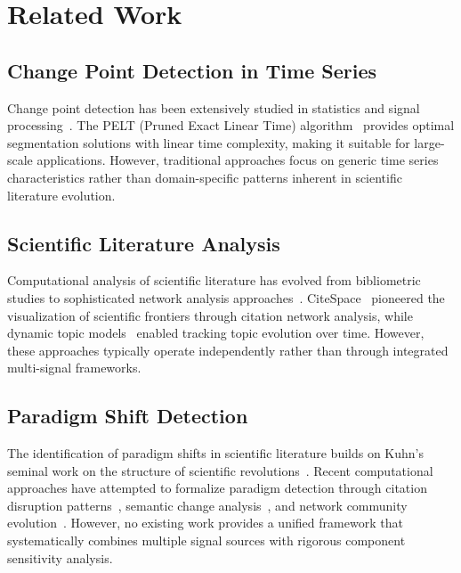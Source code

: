 \documentclass[conference]{IEEEtran}
\begin{document}
\section{Related Work}

\subsection{Change Point Detection in Time Series}

Change point detection has been extensively studied in statistics and signal processing~\cite{killick2014changepoint, chen2012parametric, truong2020selective}. The PELT (Pruned Exact Linear Time) algorithm~\cite{killick2014changepoint} provides optimal segmentation solutions with linear time complexity, making it suitable for large-scale applications. However, traditional approaches focus on generic time series characteristics rather than domain-specific patterns inherent in scientific literature evolution.

\subsection{Scientific Literature Analysis}

Computational analysis of scientific literature has evolved from bibliometric studies to sophisticated network analysis approaches~\cite{fortunato2018science, newman2004detecting}. CiteSpace~\cite{chen2006citespace} pioneered the visualization of scientific frontiers through citation network analysis, while dynamic topic models~\cite{blei2006dynamic} enabled tracking topic evolution over time. However, these approaches typically operate independently rather than through integrated multi-signal frameworks.

\subsection{Paradigm Shift Detection}

The identification of paradigm shifts in scientific literature builds on Kuhn's seminal work on the structure of scientific revolutions~\cite{kuhn1962structure}. Recent computational approaches have attempted to formalize paradigm detection through citation disruption patterns~\cite{funk2017vector}, semantic change analysis~\cite{hamilton2016diachronic}, and network community evolution~\cite{rosvall2008maps}. However, no existing work provides a unified framework that systematically combines multiple signal sources with rigorous component sensitivity analysis.
\end{document}
